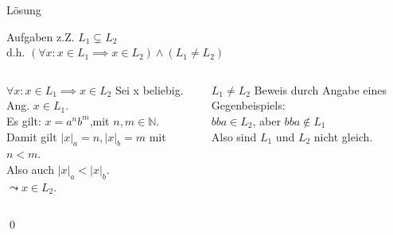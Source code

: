 {
\begin{frame}[fragile]{Lösung}
    \begin{alertblock}{Aufgaben}
    z.Z. $L_1 \subsetneq L_2$\\
    d.h. $(\forall x: x \in L_1 \implies x \in L_2) \wedge (L_1 \neq L_2)$
    \end{alertblock}
    
    \begin{columns}
    \begin{alertblock}{$\forall x: x \in L_1 \implies x \in L_2$}
        Sei x beliebig. Ang. $x \in L_1$.\\
        Es gilt: $x=a^{n}b^{m}$,mit $n,m\in\mathbb{N}$.\\
        Damit gilt $|x|_a=n, |x|_b=m$ mit $n<m$.\\
        Also auch $|x|_a < |x|_b$.\\
        $\leadsto x \in L_2$.
    \end{alertblock}
    
    \begin{alertblock}{$L_1 \neq L_2$}
        Beweis durch Angabe eines Gegenbeispiels:\\
        $bba \in L_2$, aber $bba \notin L_1$\\
        Also sind $L_1$ und $L_2$ nicht gleich.
    \end{alertblock}
    \end{columns}
    \qed
\end{frame}
}

